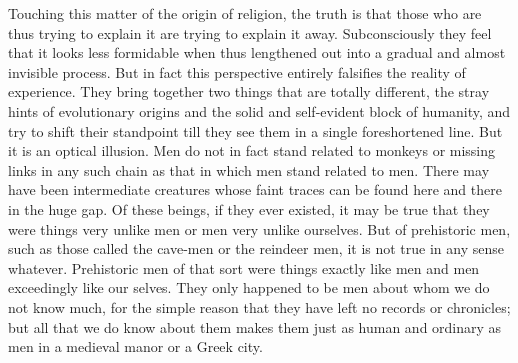 Touching this matter of the origin of religion, the truth is that those who are thus trying to explain it are trying to explain it away. Subconsciously they feel that it looks less formidable when thus lengthened out into a gradual and almost invisible process. But in fact this perspective entirely falsifies the reality of experience. They bring together two things that are totally different, the stray hints of evolutionary origins and the solid and self-evident block of humanity, and try to shift their standpoint till they see them in a single foreshortened line. But it is an optical illusion. Men do not in fact stand related to monkeys or missing links in any such chain as that in which men stand related to men. There may have been intermediate creatures whose faint traces can be found here and there in the huge gap. Of these beings, if they ever existed, it may be true that they were things very unlike men or men very unlike ourselves. But of prehistoric men, such as those called the cave-men or the reindeer men, it is not true in any sense whatever. Prehistoric men of that sort were things exactly like men and men exceedingly like our selves. They only happened to be men about whom we do not know much, for the simple reason that they have left no records or chronicles; but all that we do know about them makes them just as human and ordinary as men in a medieval manor or a Greek city.

